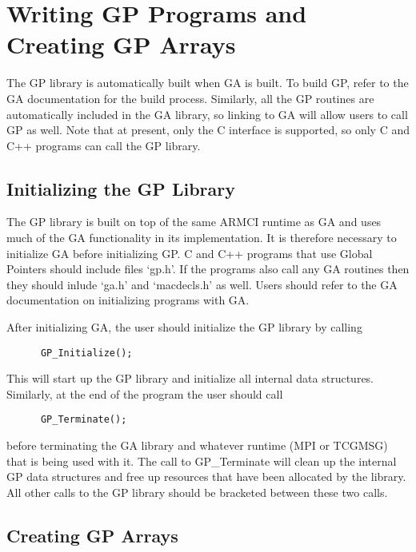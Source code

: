 \chapter{Writing GP Programs and Creating GP Arrays}

The GP library is automatically built when GA is built. To build GP, refer to
the GA documentation for the build process. Similarly, all the GP routines are
automatically included in the GA library, so linking to GA will allow users to
call GP as well. Note that at present, only the C interface is supported, so
only C and C++ programs can call the GP library.

\section{Initializing the GP Library}

The GP library is built on top of the same ARMCI runtime as GA and uses much of
the GA functionality in its implementation. It is therefore necessary to
initialize GA before initializing GP. C and C++ programs that use Global Pointers should
include files `gp.h'. If the programs also call any GA routines then they
should inlude `ga.h' and `macdecls.h' as well. Users should refer
to the GA documentation on initializing programs with GA.

After initializing GA, the user should initialize the GP library by
calling

\begin{verbatim}
      GP_Initialize();
\end{verbatim}

\noindent
This will start up the GP library and initialize all internal data structures.
Similarly, at the end of the program the user should call

\begin{verbatim}
      GP_Terminate();
\end{verbatim}

\noindent
before terminating the GA library and whatever runtime (MPI or TCGMSG) that is
being used with it. The call to GP\_Terminate will clean up the internal GP data
structures and free up resources that have been allocated by the library. All
other calls to the GP library should be bracketed between these two calls.

\section{Creating GP Arrays}

